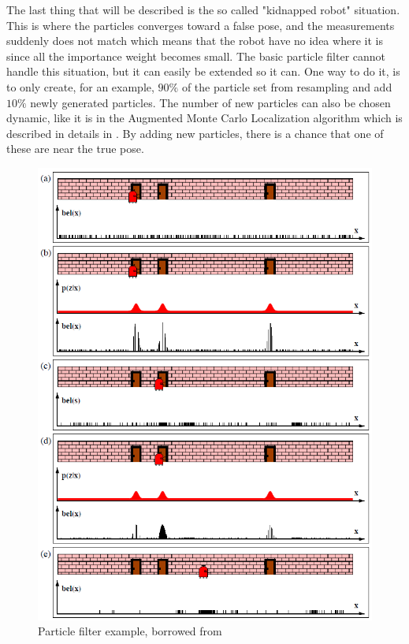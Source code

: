 \documentclass[Main]{subfiles}
\begin{document}
The last thing that will be described is the so called "kidnapped robot" situation.
This is where the particles converges toward a false pose, and the measurements suddenly does not match which means that the robot have no idea where it is since all the importance weight becomes small.
The basic particle filter cannot handle this situation, but it can easily be extended so it can.
One way to do it, is to only create, for an example, $90\%$ of the particle set from resampling and add $10\%$ newly generated particles.
The number of new particles can also be chosen dynamic, like it is in the Augmented Monte Carlo Localization algorithm which is described in details in \citep{Thrun2002}.
By adding new particles, there is a chance that one of these are near the true pose.
\begin{figure}[H]
	\centering
	\includegraphics[width=1\linewidth]{./Figures/pf_ex.png}
	\caption{Particle filter example, borrowed from \citep{Thrun2002}}
	\label{fig:pf_ex}
\end{figure}\noindent
\end{document}
